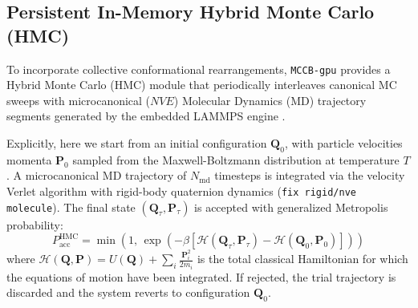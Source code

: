 \documentclass[final,5p,times,twocolumn]{elsarticle}
\begin{document}
\subsection{Persistent In-Memory Hybrid Monte Carlo (HMC)}
\label{sec:algo_hmc}

To incorporate collective conformational rearrangements,
\texttt{MCCB-gpu} provides a Hybrid Monte Carlo (HMC) module
\cite{duane1987hybrid,mehlig1992hybrid} that periodically interleaves
canonical MC sweeps with microcanonical ($NVE$) Molecular Dynamics
(MD) trajectory segments generated by the embedded LAMMPS engine
\cite{thompson2022lammps}.

Explicitly, here we start from an initial configuration  $\mathbf{Q}_0$,
with particle velocities momenta $\mathbf{P}_0$ sampled
from 
the Maxwell-Boltzmann distribution at temperature $T$. A
microcanonical MD trajectory of $N_{\text{md}}$ timesteps is
integrated via the velocity Verlet algorithm with
rigid-body quaternion dynamics (\texttt{fix rigid/nve molecule}). The final state $(\mathbf{Q}_\tau, \mathbf{P}_\tau)$
is accepted with generalized
Metropolis probability: 
\begin{equation}
     P_{\text{acc}}^{\text{HMC}} = \min\left(1, \, \exp\left(-\beta [\mathcal{H}(\mathbf{Q}_\tau, \mathbf{P}_\tau) - \mathcal{H}(\mathbf{Q}_0, \mathbf{P}_0)]\right)\right) 
\end{equation}
where  $\mathcal{H}(\mathbf{Q}, \mathbf{P}) = U(\mathbf{Q}) + \sum_i
\frac{\mathbf{P}_i^2}{2m_i}$
is the total classical Hamiltonian for
which the equations of motion have been integrated. If
rejected, the trial trajectory is discarded and the system reverts to
configuration  $\mathbf{Q}_0$.
\end{document}
